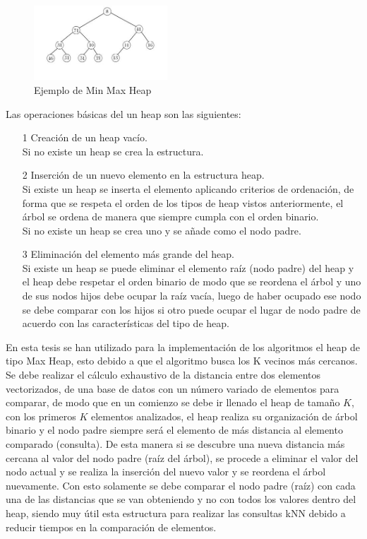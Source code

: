 \begin{itemize}
\begin{figure}[hbtp]
	\centering
	\includegraphics[width=5cm]{fig/Min-max_heap.png}
	\caption{\label{fig:minmaxheap} Ejemplo de Min Max Heap}
\end{figure} 	
\end{itemize} 

Las operaciones básicas del un heap son las siguientes:
\begin{itemize}
	\item[1] Creación de un heap vacío.\\
	Si no existe un heap se crea la estructura.
	\item[2] Inserción de un nuevo elemento en la estructura heap.\\
	Si existe un heap se inserta el elemento aplicando criterios de ordenación, de forma que se respeta el orden de los tipos de heap vistos anteriormente, el árbol se ordena de manera que siempre cumpla con el orden binario.\\
	Si no existe un heap se crea uno y se añade como el nodo padre.
	\item[3] Eliminación del elemento más grande del heap.\\
	Si existe un heap se puede eliminar el elemento raíz (nodo padre) del heap y el heap debe respetar el orden binario de modo que se reordena el árbol y uno de sus nodos hijos debe ocupar la raíz vacía, luego de haber ocupado ese nodo se debe comparar con los hijos si otro puede ocupar el lugar de nodo padre de acuerdo con las características del tipo de heap. 
\end{itemize}

En esta tesis se han utilizado para la implementación de los algoritmos el heap de tipo Max Heap, esto debido a que el algoritmo busca los K vecinos más cercanos. Se debe realizar el cálculo exhaustivo de la distancia entre dos elementos vectorizados, de una base de datos con un número variado de elementos para comparar, de modo que en un comienzo se debe ir llenado el heap de tamaño $K$, con los primeros $K$ elementos analizados, el heap realiza su organización de árbol binario y el nodo padre siempre será el elemento de más distancia al elemento comparado (consulta). De esta manera si se descubre una nueva distancia más cercana al valor del nodo padre (raíz del árbol), se procede a eliminar el valor del nodo actual y se realiza la inserción del nuevo valor y se reordena el árbol nuevamente. Con esto solamente se debe comparar el nodo padre (raíz) con cada una de las distancias que se van obteniendo y no con todos los valores dentro del heap, siendo muy útil esta estructura para realizar las consultas kNN debido a reducir tiempos en la comparación de elementos. 


